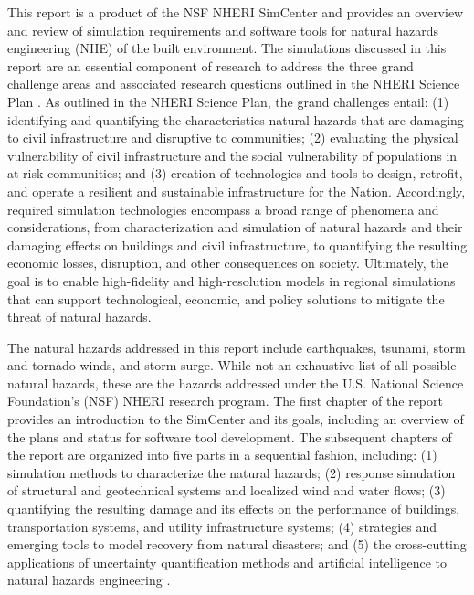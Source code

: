 %
%

\preface

This report is a product of the NSF NHERI SimCenter and provides an overview and review of simulation requirements and software tools for natural hazards engineering (NHE) of the built environment. The simulations discussed in this report are an essential component of research to address the three grand challenge areas and associated research questions outlined in the NHERI Science Plan \citep{edge2020natural}. As outlined in the NHERI Science Plan, the grand challenges entail: (1) identifying and quantifying the characteristics natural hazards that are damaging to civil infrastructure and disruptive to communities; (2) evaluating the physical vulnerability of civil infrastructure and the social vulnerability of populations in at-risk communities; and (3) creation of technologies and tools to design, retrofit, and operate a resilient and sustainable infrastructure for the Nation. Accordingly, required simulation technologies encompass a broad range of phenomena and considerations, from characterization and simulation of natural hazards and their damaging effects on buildings and civil infrastructure, to quantifying the resulting economic losses, disruption, and other consequences on society. Ultimately, the goal is to enable high-fidelity and high-resolution models in regional simulations that can support technological, economic, and policy solutions to mitigate the threat of natural hazards.

The natural hazards addressed in this report include earthquakes, tsunami, storm and tornado winds, and storm surge. While not an exhaustive list of all possible natural hazards, these are the hazards addressed under the U.S. National Science Foundation's (NSF) NHERI research program. The first chapter of the report provides an introduction to the SimCenter and its goals, including an overview of the plans and status for software tool development.  The subsequent chapters of the report are organized into five parts in a sequential fashion, including: (1) simulation methods to characterize the natural hazards; (2) response simulation of structural and geotechnical systems and localized wind and water flows; (3) quantifying the resulting damage and its effects on the performance of buildings, transportation systems, and utility infrastructure systems; (4) strategies and emerging tools to model recovery from natural disasters; and (5) the cross-cutting applications of uncertainty quantification methods and artificial intelligence to natural hazards engineering . 

